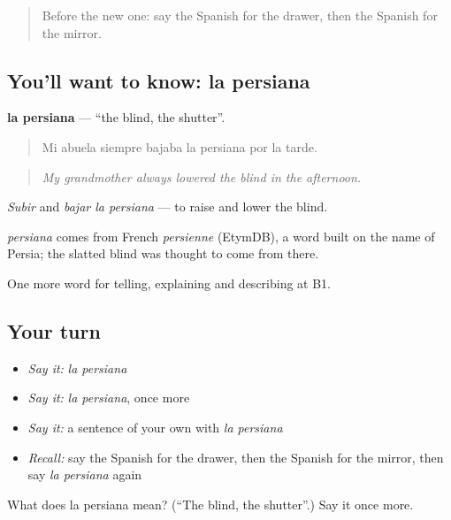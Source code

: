 \label{lesson:ES-C774-persiana}



\begin{quote}
Before the new one: say the Spanish for the drawer, then the Spanish for the mirror.
\end{quote}

\subsection*{You'll want to know: la persiana}
\textbf{la persiana} — \textquotedblleft{}the blind, the shutter\textquotedblright{}.

\begin{quote}
Mi abuela siempre bajaba la persiana por la tarde.
\end{quote}

\begin{quote}
\emph{My grandmother always lowered the blind in the afternoon.}
\end{quote}

\emph{Subir} and \emph{bajar la persiana} — to raise and lower the blind.

\begin{cousinweb}
\emph{persiana} comes from French \emph{persienne} (EtymDB), a word built on the name of Persia; the slatted blind was thought to come from there.
\end{cousinweb}

\begin{grammarlens}[title={What you've built}]
One more word for telling, explaining and describing at B1.
\end{grammarlens}

\subsection*{Your turn}
\begin{itemize}
\raggedright
  \item \emph{Say it:} \emph{la persiana}
  \item \emph{Say it:} \emph{la persiana}, once more
  \item \emph{Say it:} a sentence of your own with \emph{la persiana}
  \item \emph{Recall:} say the Spanish for the drawer, then the Spanish for the mirror, then say \emph{la persiana} again
\end{itemize}

\begin{tcolorbox}[breakable,colback=teal!4,colframe=teal!35!black,title={Before you move on}]
What does la persiana mean? (\textquotedblleft{}The blind, the shutter\textquotedblright{}.) Say it once more.
\end{tcolorbox}

